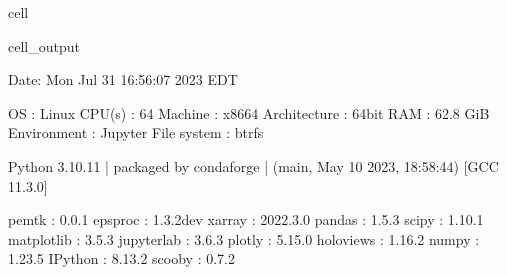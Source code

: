 \documentclass[letterpaper,table,10pt,english]{jupyterBook}
\begin{document}
\begin{sphinxuseclass}{cell}
\begin{sphinxVerbatimOutput}
\begin{sphinxuseclass}{cell_output}
\begin{sphinxVerbatim}[commandchars=\\\{\}]
\PYGZhy{}\PYGZhy{}\PYGZhy{}\PYGZhy{}\PYGZhy{}\PYGZhy{}\PYGZhy{}\PYGZhy{}\PYGZhy{}\PYGZhy{}\PYGZhy{}\PYGZhy{}\PYGZhy{}\PYGZhy{}\PYGZhy{}\PYGZhy{}\PYGZhy{}\PYGZhy{}\PYGZhy{}\PYGZhy{}\PYGZhy{}\PYGZhy{}\PYGZhy{}\PYGZhy{}\PYGZhy{}\PYGZhy{}\PYGZhy{}\PYGZhy{}\PYGZhy{}\PYGZhy{}\PYGZhy{}\PYGZhy{}\PYGZhy{}\PYGZhy{}\PYGZhy{}\PYGZhy{}\PYGZhy{}\PYGZhy{}\PYGZhy{}\PYGZhy{}\PYGZhy{}\PYGZhy{}\PYGZhy{}\PYGZhy{}\PYGZhy{}\PYGZhy{}\PYGZhy{}\PYGZhy{}\PYGZhy{}\PYGZhy{}\PYGZhy{}\PYGZhy{}\PYGZhy{}\PYGZhy{}\PYGZhy{}\PYGZhy{}\PYGZhy{}\PYGZhy{}\PYGZhy{}\PYGZhy{}\PYGZhy{}\PYGZhy{}\PYGZhy{}\PYGZhy{}\PYGZhy{}\PYGZhy{}\PYGZhy{}\PYGZhy{}\PYGZhy{}\PYGZhy{}\PYGZhy{}\PYGZhy{}\PYGZhy{}\PYGZhy{}\PYGZhy{}\PYGZhy{}\PYGZhy{}\PYGZhy{}\PYGZhy{}\PYGZhy{}
  Date: Mon Jul 31 16:56:07 2023 EDT

                OS : Linux
            CPU(s) : 64
           Machine : x86\PYGZus{}64
      Architecture : 64bit
               RAM : 62.8 GiB
       Environment : Jupyter
       File system : btrfs

  Python 3.10.11 | packaged by conda\PYGZhy{}forge | (main, May 10 2023, 18:58:44)
  [GCC 11.3.0]

             pemtk : 0.0.1
           epsproc : 1.3.2\PYGZhy{}dev
            xarray : 2022.3.0
            pandas : 1.5.3
             scipy : 1.10.1
        matplotlib : 3.5.3
        jupyterlab : 3.6.3
            plotly : 5.15.0
         holoviews : 1.16.2
             numpy : 1.23.5
           IPython : 8.13.2
            scooby : 0.7.2
\PYGZhy{}\PYGZhy{}\PYGZhy{}\PYGZhy{}\PYGZhy{}\PYGZhy{}\PYGZhy{}\PYGZhy{}\PYGZhy{}\PYGZhy{}\PYGZhy{}\PYGZhy{}\PYGZhy{}\PYGZhy{}\PYGZhy{}\PYGZhy{}\PYGZhy{}\PYGZhy{}\PYGZhy{}\PYGZhy{}\PYGZhy{}\PYGZhy{}\PYGZhy{}\PYGZhy{}\PYGZhy{}\PYGZhy{}\PYGZhy{}\PYGZhy{}\PYGZhy{}\PYGZhy{}\PYGZhy{}\PYGZhy{}\PYGZhy{}\PYGZhy{}\PYGZhy{}\PYGZhy{}\PYGZhy{}\PYGZhy{}\PYGZhy{}\PYGZhy{}\PYGZhy{}\PYGZhy{}\PYGZhy{}\PYGZhy{}\PYGZhy{}\PYGZhy{}\PYGZhy{}\PYGZhy{}\PYGZhy{}\PYGZhy{}\PYGZhy{}\PYGZhy{}\PYGZhy{}\PYGZhy{}\PYGZhy{}\PYGZhy{}\PYGZhy{}\PYGZhy{}\PYGZhy{}\PYGZhy{}\PYGZhy{}\PYGZhy{}\PYGZhy{}\PYGZhy{}\PYGZhy{}\PYGZhy{}\PYGZhy{}\PYGZhy{}\PYGZhy{}\PYGZhy{}\PYGZhy{}\PYGZhy{}\PYGZhy{}\PYGZhy{}\PYGZhy{}\PYGZhy{}\PYGZhy{}\PYGZhy{}\PYGZhy{}\PYGZhy{}
\end{sphinxVerbatim}

\end{sphinxuseclass}\end{sphinxVerbatimOutput}

\end{sphinxuseclass}
\end{document}
